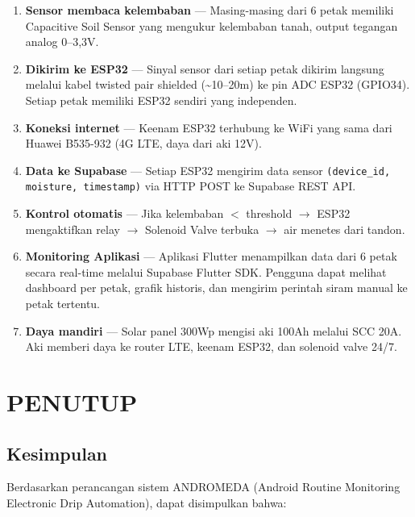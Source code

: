\documentclass[12pt,a4paper,oneside]{report}
\begin{document}
\begin{enumerate}
    \item \textbf{Sensor membaca kelembaban} — Masing-masing dari 6 petak memiliki Capacitive Soil Sensor yang mengukur kelembaban tanah, output tegangan analog 0--3,3V.
    \item \textbf{Dikirim ke ESP32} — Sinyal sensor dari setiap petak dikirim langsung melalui kabel twisted pair shielded (\textasciitilde10--20m) ke pin ADC ESP32 (GPIO34). Setiap petak memiliki ESP32 sendiri yang independen.
    \item \textbf{Koneksi internet} — Keenam ESP32 terhubung ke WiFi yang sama dari Huawei B535-932 (4G LTE, daya dari aki 12V).
    \item \textbf{Data ke Supabase} — Setiap ESP32 mengirim data sensor \texttt{(device\_id, moisture, timestamp)} via HTTP POST ke Supabase REST API.
    \item \textbf{Kontrol otomatis} — Jika kelembaban $<$ threshold $\to$ ESP32 mengaktifkan relay $\to$ Solenoid Valve terbuka $\to$ air menetes dari tandon.
    \item \textbf{Monitoring Aplikasi} — Aplikasi Flutter menampilkan data dari 6 petak secara real-time melalui Supabase Flutter SDK. Pengguna dapat melihat dashboard per petak, grafik historis, dan mengirim perintah siram manual ke petak tertentu.
    \item \textbf{Daya mandiri} — Solar panel 300Wp mengisi aki 100Ah melalui SCC 20A. Aki memberi daya ke router LTE, keenam ESP32, dan solenoid valve 24/7.
\end{enumerate}




\chapter{PENUTUP}

\section{Kesimpulan}

Berdasarkan perancangan sistem ANDROMEDA (Android Routine Monitoring Electronic Drip Automation), dapat disimpulkan bahwa:
\end{document}
